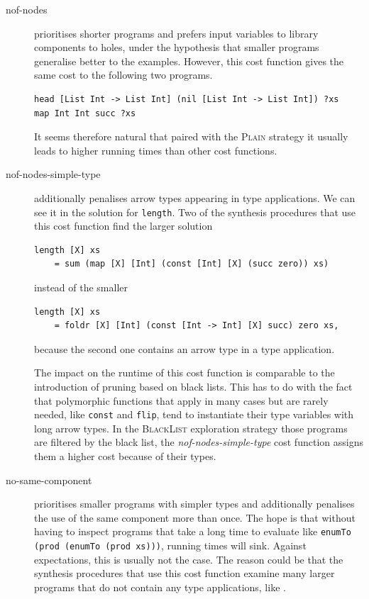\begin{description}
\item[nof-nodes] prioritises shorter programs and prefers input variables to library components to holes, under the hypothesis that smaller programs generalise better to the examples. However, this cost function gives the same cost to the following two programs.
\begin{lstlisting}[style=plain]
head [List Int -> List Int] (nil [List Int -> List Int]) ?xs
map Int Int succ ?xs
\end{lstlisting}
It seems therefore natural that paired with the \textsc{Plain} strategy it usually leads to higher running times than other cost functions.

\item[nof-nodes-simple-type] additionally penalises arrow types appearing in type applications. We can see it in the solution for \lstinline?length?. Two of the synthesis procedures that use this cost function find the larger solution
\begin{lstlisting}
length [X] xs
    = sum (map [X] [Int] (const [Int] [X] (succ zero)) xs)
\end{lstlisting}
instead of the smaller
\begin{lstlisting}
length [X] xs
    = foldr [X] [Int] (const [Int -> Int] [X] succ) zero xs,
\end{lstlisting}
because the second one contains an arrow type in a type application.

The impact on the runtime of this cost function is comparable to the introduction of pruning based on black lists. This has to do with the fact that polymorphic functions that apply in many cases but are rarely needed, like \lstinline?const? and \lstinline?flip?, tend to instantiate their type variables with long arrow types. In the \textsc{BlackList} exploration strategy those programs are filtered by the black list, the \textit{nof-nodes-simple-type} cost function assigns them a higher cost because of their types.

\item[no-same-component] prioritises smaller programs with simpler types and additionally penalises the use of the same component more than once. The hope is that without having to inspect programs that take a long time to evaluate like \lstinline?enumTo (prod (enumTo (prod xs)))?, running times will sink. Against expectations, this is usually not the case. The reason could be that the synthesis procedures that use this cost function examine many larger programs that do not contain any type applications, like .
\end{description}

